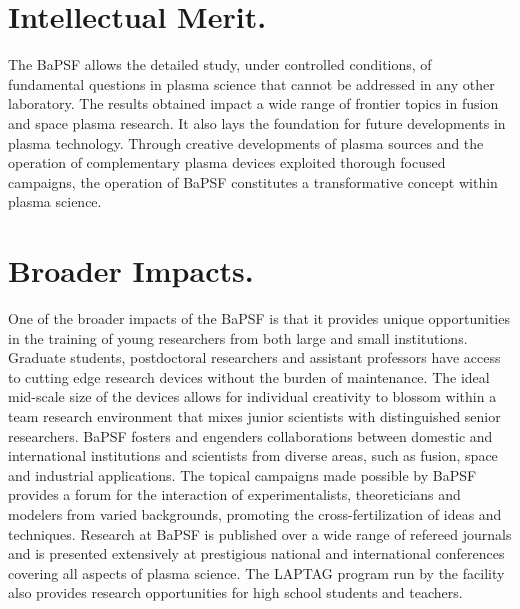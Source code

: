 \documentclass[11pt]{article}
\begin{document}
\section{Intellectual Merit.}

The BaPSF allows the detailed study, under controlled conditions, of
fundamental questions in plasma science that cannot be addressed in any
other laboratory. The results obtained impact a wide range of frontier
topics in fusion and space plasma research. It also lays the foundation
for future developments in plasma technology. Through creative
developments of plasma sources and the operation of complementary plasma
devices exploited thorough focused campaigns, the operation of BaPSF
constitutes a transformative concept within plasma science.

\section{Broader Impacts.}

One of the broader impacts of the BaPSF is that it provides unique
opportunities in the training of young researchers from both large and
small institutions. Graduate students, postdoctoral researchers and
assistant professors have access to cutting edge research devices
without the burden of maintenance. The ideal mid-scale size of the
devices allows for individual creativity to blossom within a team
research environment that mixes junior scientists with distinguished senior
researchers. BaPSF fosters and engenders collaborations between domestic
and international institutions and scientists from diverse
areas, such as fusion, space and industrial applications. The topical
campaigns made possible by BaPSF provides a forum for the interaction of
experimentalists, theoreticians and modelers from varied backgrounds,
promoting the cross-fertilization of ideas and techniques. Research at
BaPSF is published over a wide range of refereed journals and is
presented extensively at prestigious national and international
conferences covering all aspects of plasma science. The LAPTAG program
run by the facility also provides research opportunities for high school
students and teachers.


\newpage

\setcounter{page}{1}

%
%

  
\end{document}
